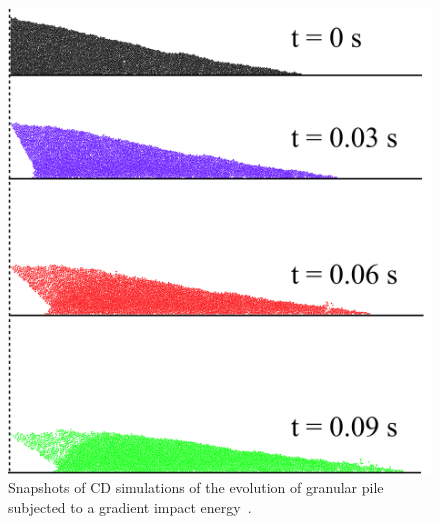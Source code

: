 \begin{figure}[tbph]
\centering
\includegraphics[width=\textwidth]{Gradient_Slope_CD_200J}
\caption{Snapshots of CD simulations of the evolution of granular pile 
subjected to a gradient impact energy~\citep{Mutabaruka2013}.}
\label{fig:Gradient_Slope_CD_200J}
\end{figure}

